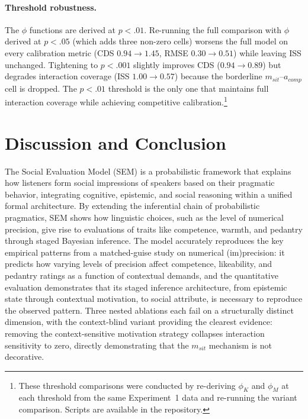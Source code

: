 \documentclass[12pt,a4paper]{article}
\begin{document}
\paragraph{Threshold robustness.}
The $\phi$ functions are derived at $p < .01$. Re-running the full comparison
with $\phi$ derived at $p < .05$ (which adds three non-zero cells) worsens the
full model on every calibration metric (CDS $0.94 \to 1.45$, RMSE $0.30 \to
0.51$) while leaving ISS unchanged. Tightening to $p < .001$ slightly improves
CDS ($0.94 \to 0.89$) but degrades interaction coverage (ISS $1.00 \to 0.57$)
because the borderline $m_{sit}$--$a_{comp}$ cell is dropped. The $p < .01$
threshold is the only one that maintains full interaction coverage while
achieving competitive calibration.\footnote{These threshold comparisons were
conducted by re-deriving $\phi_K$ and $\phi_M$ at each threshold from the same
Experiment~1 data and re-running the variant comparison. Scripts are available
in the repository.}


\section{Discussion and Conclusion}
\label{sec:conclusion}

The Social Evaluation Model (SEM) is a probabilistic framework that explains
how listeners form social impressions of speakers based on their pragmatic
behavior, integrating cognitive, epistemic, and social reasoning within a
unified formal architecture. By extending the inferential chain of probabilistic
pragmatics, SEM shows how linguistic choices, such as the level of numerical
precision, give rise to evaluations of traits like competence, warmth, and
pedantry through staged Bayesian inference. The model accurately reproduces the
key empirical patterns from a matched-guise study on numerical (im)precision: it
predicts how varying levels of precision affect competence, likeability, and
pedantry ratings as a function of contextual demands, and the quantitative
evaluation demonstrates that its staged inference architecture, from epistemic
state through contextual motivation, to social attribute, is necessary to
reproduce the observed pattern. Three nested ablations each fail on a
structurally distinct dimension, with the context-blind variant providing the
clearest evidence: removing the context-sensitive motivation strategy collapses
interaction sensitivity to zero, directly demonstrating that the $m_{sit}$
mechanism is not decorative.
\end{document}
